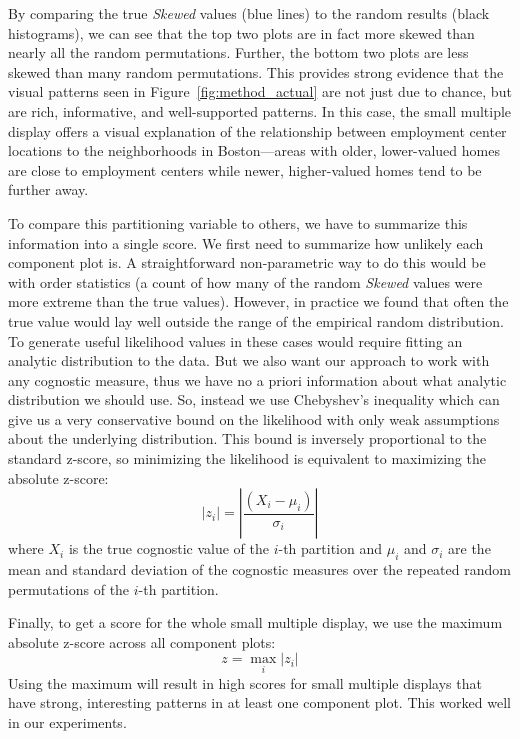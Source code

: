 By comparing the true \emph{Skewed} values (blue lines) to the random results (black histograms), we can see that the top two plots are in fact more skewed than nearly all the random permutations. Further, the bottom two plots are less skewed than many random permutations. This provides strong evidence that the visual patterns seen in Figure~\ref{fig:method_actual} are not just due to chance, but are rich, informative, and well-supported patterns.  In this case, the small multiple display offers a visual explanation of the relationship between employment center locations to the neighborhoods in Boston---areas with older, lower-valued homes are close to employment centers while newer, higher-valued homes tend to be further away.

To compare this partitioning variable to others, we have to summarize this information into a single score. We first need to summarize how unlikely each component plot is. A straightforward non-parametric way to do this would be with order statistics (a count of how many of the random \emph{Skewed} values were more extreme than the true values). However, in practice we found that often the true value would lay well outside the range of the empirical random distribution. To generate useful likelihood values in these cases would require fitting an analytic distribution to the data. But we also want our approach to work with any cognostic measure, thus we have no a priori information about what analytic distribution we should use. So, instead we use Chebyshev's inequality which can give us a very conservative bound on the likelihood with only weak assumptions about the underlying distribution. This bound is inversely proportional to the standard z-score, so minimizing the likelihood is equivalent to maximizing the absolute z-score:
$$|z_i| = \left|\frac{(X_i-\mu_i)}{\sigma_i}\right|$$ 
where $X_i$ is the true cognostic value of the $i$-th partition and $\mu_i$ and $\sigma_i$ are the mean and standard deviation of the cognostic measures over the repeated random permutations of the $i$-th partition.

Finally, to get a score for the whole small multiple display, we use the maximum absolute z-score across all component plots: 
$$z = \max_{i} |z_i|$$
Using the maximum will result in high scores for small multiple displays that have strong, interesting patterns in at least one component plot. This worked well in our experiments.

